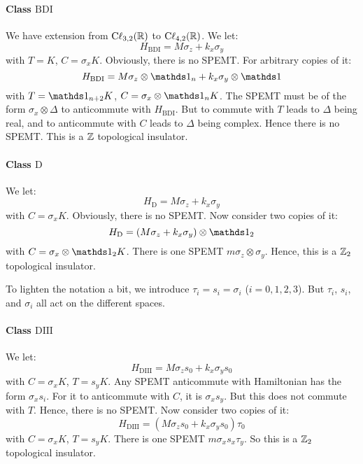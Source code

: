 \paragraph{Class $\mathrm{BDI}$} We have extension from
$\mathrm{C\ell}_{3,2}(\mathbb{R})$ to $\mathrm{C\ell}_{4,2}(\mathbb{R})$. We let:
\begin{equation}
    H_{\mathrm{BDI}} = M\sigma_z + k_x \sigma_y
\end{equation}
with $T=K$, $C=\sigma_x K$. Obviously, there is no SPEMT. For arbitrary copies
of it:
\begin{equation}
    H_{\mathrm{BDI}} = M\sigma_z\otimes\id_n + k_x \sigma_y\otimes\id
\end{equation}
with $T=\id_{n+2}K$, $C=\sigma_x\otimes\id_n K$.  The SPEMT must be of the form
$\sigma_x\otimes\Delta$ to anticommute with $H_{\mathrm{BDI}}$. But to commute with
$T$ leads to $\Delta$ being real, and to anticommute with $C$ leads to $\Delta$ being
complex. Hence there is no SPEMT. This is a $\mathbb{Z}$ topological insulator.

\paragraph{Class $\mathrm{D}$} We let:
\begin{equation}
    H_{\mathrm{D}} = M\sigma_z + k_x \sigma_y
\end{equation}
with $C=\sigma_x K$. Obviously, there is no SPEMT. Now consider two copies of
it:
\begin{equation}
    H_{\mathrm{D}} = (M\sigma_z + k_x \sigma_y)\otimes\id_2
\end{equation}
with $C=\sigma_x\otimes\id_2 K$. There is one SPEMT $m \sigma_z\otimes\sigma_y$.
Hence, this is a $\mathbb{Z}_2$ topological insulator.

To lighten the notation a bit, we introduce $\tau_i=s_i=\sigma_i$ ($i=0,1,2,3$).
But $\tau_i$, $s_i$, and $\sigma_i$ all act on the different spaces.
\paragraph{Class $\mathrm{DIII}$} We let:
\begin{equation}
    H_{\mathrm{DIII}} = M \sigma_z s_0 + k_x \sigma_y s_0
\end{equation}
with $C=\sigma_x K$, $T=s_y K$. Any SPEMT anticommute with Hamiltonian has the
form $\sigma_x s_i$. For it to anticommute with $C$, it is $\sigma_x s_y$. But
this does not commute with $T$. Hence, there is no SPEMT. Now consider two
copies of it:
\begin{equation}
    H_{\mathrm{DIII}} = (M \sigma_z s_0 + k_x \sigma_y s_0)\tau_0
\end{equation}
with $C=\sigma_x K$, $T=s_y K$.  There is one SPEMT $m \sigma_xs_x\tau_y$. So
this is a $\mathbb{Z}_2$ topological insulator.

